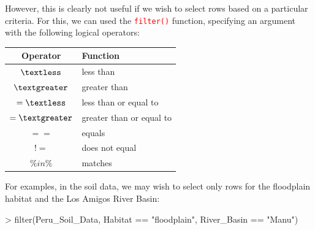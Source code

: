 \documentclass[a4paper,12pt]{article}
\newcommand\code[1]{\textcolor{red}{\texttt{#1}}}
\begin{document}
However, this is clearly not useful if we wish to select rows based on a particular criteria. For this, we can used the \code{filter()} function, specifying an argument with the following logical operators:

\begin{table}[h]
	\centering
	\begin{tabular}{cl}
		
		Operator & Function \\ \hline
		$\textless$ & less than \\
		$\textgreater$ & greater than\\
		$=\textless$ & less than or equal to\\
		$=\textgreater$ & greater than or equal to\\
		$==$ & equals \\
		$!=$ & does not equal \\
		$\%in\%$ & matches \\

	\end{tabular}
	 
	\label{tbl:Boolean}
\end{table}

For examples, in the soil data, we may wish to select only rows for the floodplain habitat and the Los Amigos River Basin:

\begin{shaded}
\begin{Schunk}
\begin{Sinput}
> filter(Peru_Soil_Data, Habitat == "floodplain", River_Basin == "Manu")
\end{Sinput}
\end{Schunk}
\end{shaded}

\end{document}
